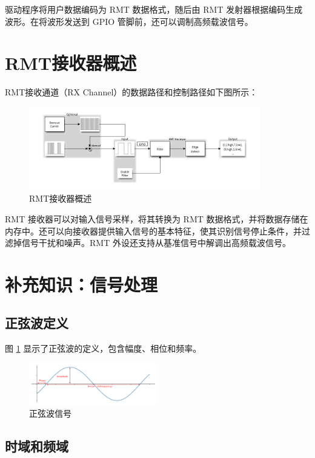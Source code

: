 \documentclass[lang=cn,newtx,10pt,scheme=chinese]{elegantbook}
\begin{document}
驱动程序将用户数据编码为 RMT 数据格式，随后由 RMT 发射器根据编码生成波形。在将波形发送到 GPIO 管脚前，还可以调制高频载波信号。

\section{RMT接收器概述}

RMT接收通道（RX Channel）的数据路径和控制路径如下图所示：

\begin{figure}[!htb]
\centering
\includegraphics[width=0.9\textwidth]{RMT-3.png}
\caption{RMT接收器概述}
\end{figure}

RMT 接收器可以对输入信号采样，将其转换为 RMT 数据格式，并将数据存储在内存中。还可以向接收器提供输入信号的基本特征，使其识别信号停止条件，并过滤掉信号干扰和噪声。RMT 外设还支持从基准信号中解调出高频载波信号。

\section{补充知识：信号处理}

\subsection{正弦波定义}

图 \ref{fig:amplitude_phase_period} 显示了正弦波的定义，包含幅度、相位和频率。

\begin{figure}[!htb]
\centering
\includegraphics[width=0.5\textwidth]{amplitude_phase_period.pdf}
\caption{正弦波信号}
\label{fig:amplitude_phase_period}
\end{figure}

\subsection{时域和频域}
\end{document}
